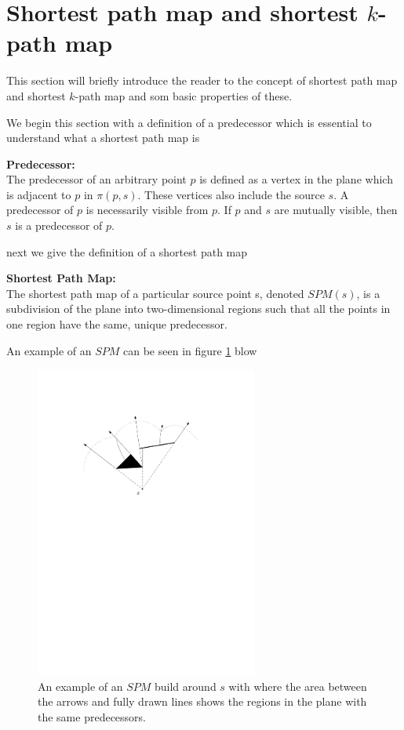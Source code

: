 \section{Shortest path map and shortest $k$-path map}

This section will briefly introduce the reader to the concept of shortest path map
and shortest $k$-path map and som basic properties of these.

We begin this section with a definition of a predecessor which is essential to understand
what a shortest path map is

\begin{mydef}
	\textbf{Predecessor:} \\ 
	The predecessor of an arbitrary point $p$ is defined as a vertex in the plane which is 
	adjacent to $p$ in $\pi(p,s)$. These vertices also include the source $s$. A predecessor of
	$p$ is necessarily visible from $p$. If $p$ and $s$ are mutually visible,
	then $s$ is a predecessor of $p$. \cite{HershbergerS99} 
\end{mydef}

next we give the definition of a shortest path map

\begin{mydef}
	\textbf{Shortest Path Map:} \\ 
	The shortest path map  of a
	particular source point s, denoted $SPM(s)$, is a subdivision of the plane
	into two-dimensional regions such that all the points in one region have the
	same, unique predecessor\cite{HershbergerS99}. 
\end{mydef}

An example of an $SPM$ can be seen in figure \ref{fig:exampleofspms} blow

\begin{figure}[H] 
	\centering
	\includegraphics[width=0.65\textwidth]{figures/exampleofspms.pdf}
	\caption{An example of an $SPM$ build around $s$ with where the area between
	         the arrows and fully drawn lines shows the regions in the plane with
	         the same predecessors.}
	\label{fig:exampleofspms} 
\end{figure}

